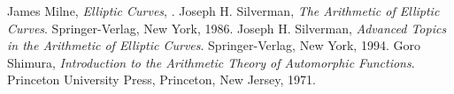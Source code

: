 \documentclass[12pt]{article}
\begin{document}
\begin{thebibliography}{9}
 James Milne, {\em Elliptic Curves}, .
 Joseph H. Silverman, {\em The Arithmetic of Elliptic Curves}. Springer-Verlag, New York, 1986.
 Joseph H. Silverman, {\em Advanced Topics in
the Arithmetic of Elliptic Curves}. Springer-Verlag, New York,
1994.
 Goro Shimura, {\em Introduction to the
Arithmetic Theory of Automorphic Functions}. Princeton University
Press, Princeton, New Jersey, 1971.
\end{thebibliography}
\end{document}
